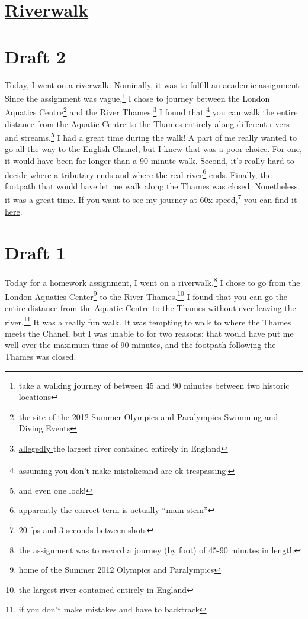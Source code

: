\documentclass[12pt]{article}[titlepage]
\newcommand{\say}[1]{``#1''}
\newcommand{\1}{\={a}}
\newcommand{\2}{\={e}}
\newcommand{\3}{\={\i}}
\newcommand{\4}{\=o}
\newcommand{\5}{\=u}
\newcommand{\6}{\={A}}
\renewcommand{\,}{\textsuperscript{,}}
\begin{document}
\doublespacing

\section{\href{riverwalk.html}{Riverwalk}}
\section{Draft 2}
Today, I went on a riverwalk.
Nominally, it was to fulfill an academic assignment.
Since the assignment was vague,\footnote{take a walking journey of between 45 and 90 minutes between two historic locations} I chose to journey between the London Aquatics Centre\footnote{the site of the 2012 Summer Olympics and Paralympics Swimming and Diving Events} and the River Thames.\footnote{\href{https://en.wikipedia.org/wiki/River_Thames}{allegedly }the largest river contained entirely in England}
I found that
\footnote{assuming you don't make mistakes\footnotemark and are ok trespassing\footnotemark\,\footnotemark}
you can walk the entire distance from the Aquatic Centre to the Thames entirely along different rivers and streams.\footnote{and even one lock!}
I had a great time during the walk!
A part of me really wanted to go all the way to the English Chanel, but I knew that was a poor choice.
For one, it would have been far longer than a 90 minute walk.
Second, it's really hard to decide where a tributary ends and where the real river\footnote{apparently the correct term is actually \href{https://en.wikipedia.org/wiki/Main_stem}{\say{main stem}}} ends.
Finally, the footpath that would have let me walk along the Thames was closed.
Nonetheless, it was a great time.
If you want to see my journey at 60x speed,\footnote{20 fps and 3 seconds between shots} you can find it \href{https://vimeo.com/288755224}{here}.

\section{Draft 1}
Today for a homework assignment, I went on a riverwalk.\footnote{the assignment was to record a journey (by foot) of 45-90 minutes in length}
I chose to go from the London Aquatics Center\footnote{home of the Summer 2012 Olympics and Paralympics} to the River Thames.\footnote{the largest river contained entirely in England}
I found that you can go the entire distance from the Aquatic Centre to the Thames without ever leaving the river.\footnote{if you don't make mistakes and have to backtrack\footnotemark}
It was a really fun walk.
It was tempting to walk to where the Thames meets the Chanel, but I was unable to for two reasons: that would have put me well over the maximum time of 90 minutes, and the footpath following the Thames was closed.
\end{document}
